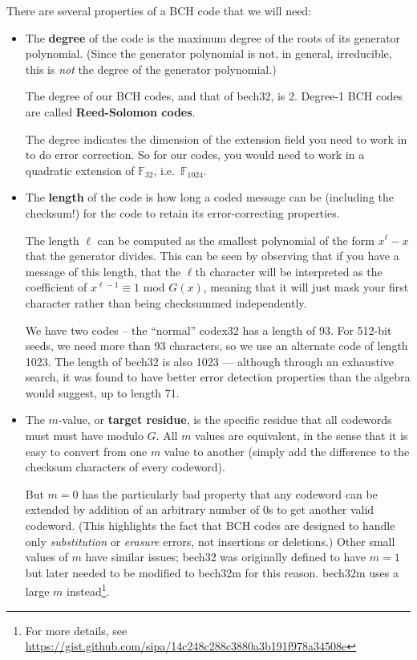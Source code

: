 \documentclass[letterpaper]{article}
\newcommand{\fttwo}{\mathbb{F}_{32}}
\newcommand{\ftttwo}{\mathbb{F}_{1024}}
\begin{document}
There are several properties of a BCH code that we will need:
\begin{itemize}
\item The \textbf{degree} of the code is the maximum degree of the roots of
its generator polynomial. (Since the generator polynomial is not, in general,
irreducible, this is \emph{not} the degree of the generator polynomial.)

The degree of our BCH codes, and that of bech32, is 2. Degree-1 BCH codes are
called \textbf{Reed-Solomon codes}.

The degree indicates the dimension of the extension field you need to work
in to do error correction. So for our codes, you would need to work in a
quadratic extension of $\fttwo$, i.e.~$\ftttwo$.

\item The \textbf{length} of the code is how long a coded message can be
(including the checksum!) for the code to retain its error-correcting
properties.

The length $\ell$ can be computed as the smallest polynomial of the form
$x^\ell - x$ that the generator divides. This can be seen by observing
that if you have a message of this length, that the $\ell$th character
will be interpreted as the coefficient of $x^{\ell-1} \equiv 1$ mod $G(x)$,
meaning that it will just mask your first character rather than being
checksummed independently.

We have two codes -- the ``normal'' codex32 has a length of 93. For 512-bit
seeds, we need more than 93 characters, so we use an alternate code of
length 1023. The length of bech32 is also 1023 --- although through
an exhaustive search, it was found to have better error detection properties
than the algebra would suggest, up to length 71.

\item The $m$-value, or \textbf{target residue}, is the specific residue that
all codewords must must have modulo $G$. All $m$ values are equivalent, in
the sense that it is easy to convert from one $m$ value to another (simply
add the difference to the checksum characters of every codeword).

But $m=0$ has the particularly bad property that any codeword can be extended
by addition of an arbitrary number of 0s to get another valid codeword. (This
highlights the fact that BCH codes are designed to handle only \emph{substitution}
or \emph{erasure} errors, not insertions or deletions.) Other small values of
$m$ have similar issues; bech32 was originally defined to have $m=1$ but later
needed to be modified to bech32m for this reason. bech32m uses a large $m$
instead\footnote{For more details, see
\url{https://gist.github.com/sipa/14c248c288c3880a3b191f978a34508e}}.


\end{itemize}
\end{document}
